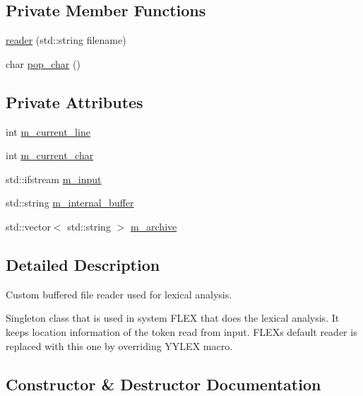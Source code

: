 \subsection*{Private Member Functions}
\begin{DoxyCompactItemize}
\item 
\hyperlink{classjawe_1_1reader_a26cb352853e28ca605e4adae1be3932d}{reader} (std\+::string filename)
\item 
char \hyperlink{classjawe_1_1reader_aae8ef7ace0047d2af3263485e9aeb436}{pop\+\_\+char} ()
\end{DoxyCompactItemize}
\subsection*{Private Attributes}
\begin{DoxyCompactItemize}
\item 
int \hyperlink{classjawe_1_1reader_a92fd8507e6acfd76a682568fa93f6ec5}{m\+\_\+current\+\_\+line}
\item 
int \hyperlink{classjawe_1_1reader_ace2997e2bb0166b8fc46686379269a58}{m\+\_\+current\+\_\+char}
\item 
std\+::ifstream \hyperlink{classjawe_1_1reader_a2dd519e2a01d6b51b10e470e63951bb3}{m\+\_\+input}
\item 
std\+::string \hyperlink{classjawe_1_1reader_a215da54dad86f6c35c067dd30c9a219a}{m\+\_\+internal\+\_\+buffer}
\item 
std\+::vector$<$ std\+::string $>$ \hyperlink{classjawe_1_1reader_a912c0f8fe8963fbdd6aba7e7d2424072}{m\+\_\+archive}
\end{DoxyCompactItemize}


\subsection{Detailed Description}
Custom buffered file reader used for lexical analysis. 

Singleton class that is used in system F\+L\+EX that does the lexical analysis. It keeps location information of the token read from input. F\+L\+EX\textquotesingle{}s default reader is replaced with this one by overriding Y\+Y\+L\+EX macro. 

\subsection{Constructor \& Destructor Documentation}
\mbox{\label{classjawe_1_1reader_ab2708933dc1a57d53d27601c82053a6e}} 
